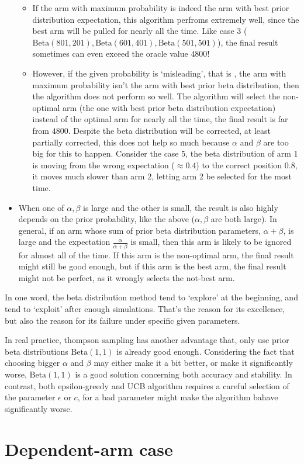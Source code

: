 \documentclass[11pt]{article}
\begin{document}
\begin{itemize}
  \begin{itemize}
  \item
    If the arm with maximum probability is indeed the arm with best
    prior distribution expectation, this algorithm perfroms extremely
    well, since the best arm will be pulled for nearly all the time.
    Like case 3
    (\(\mathrm{Beta}(801, 201), \mathrm{Beta}(601, 401), \mathrm{Beta}(501, 501)\)),
    the final result sometimes can even exceed the oracle value
    \(4800\)!
  \item
    However, if the given probability is `misleading', that is , the arm
    with maximum probability isn't the arm with best prior beta
    distribution, then the algorithm does not perform so well. The
    algorithm will select the non-optimal arm (the one with best prior
    beta distribution expectation) instead of the optimal arm for nearly
    all the time, the final result is far from \(4800\). Despite the
    beta distribution will be corrected, at least partially corrected,
    this does not help so much because \(\alpha\) and \(\beta\) are too
    big for this to happen. Consider the case 5, the beta distribution
    of arm 1 is moving from the wrong expectation (\(\approx 0.4\)) to
    the correct position \(0.8\), it moves much slower than arm \(2\),
    letting arm 2 be selected for the most time.
  \end{itemize}
\item
  When one of \(\alpha, \beta\) is large and the other is small, the
  result is also highly depends on the prior probability, like the above
  (\(\alpha, \beta\) are both large). In general, if an arm whose sum of
  prior beta distribution parameters, \(\alpha+\beta\), is large and the
  expectation \(\frac{\alpha}{\alpha+\beta}\) is small, then this arm is
  likely to be ignored for almost all of the time. If this arm is the
  non-optimal arm, the final result might still be good enough, but if
  this arm is the best arm, the final result might not be perfect, as it
  wrongly selects the not-best arm.
\end{itemize}

In one word, the beta distribution method tend to `explore' at the
beginning, and tend to `exploit' after enough simulations. That's the
reason for its excellence, but also the reason for its failure under
specific given parameters.

In real practice, thompson sampling has another advantage that, only use
prior beta distributions \(\mathrm{Beta}(1,1)\) is already good enough.
Considering the fact that choosing bigger \(\alpha\) and \(\beta\) may
either make it a bit better, or make it significantly worse,
\(\mathrm{Beta}(1,1)\) is a good solution concerning both accuracy and
stability. In contrast, both epsilon-greedy and UCB algorithm requires a
careful selection of the parameter \(\epsilon\) or \(c\), for a bad
parameter might make the algorithm bahave significantly worse.
\pagebreak
    \hypertarget{dependent-arm-case}{%
\section{Dependent-arm case}\label{dependent-arm-case}}
\end{document}
